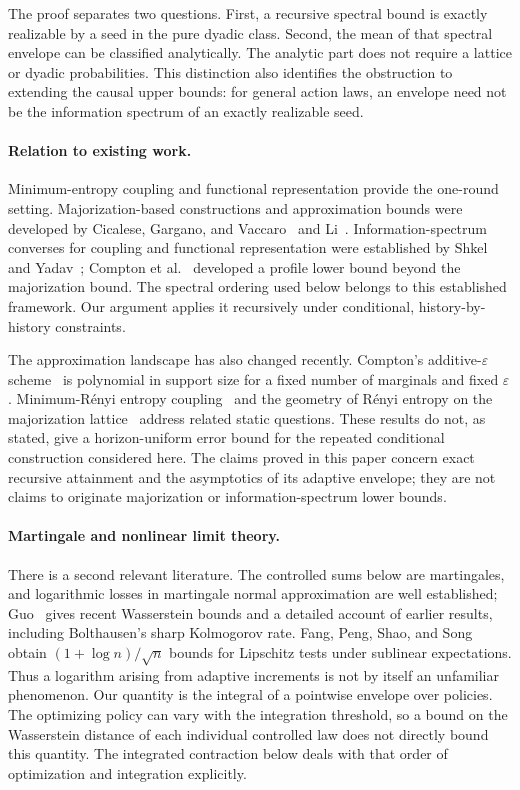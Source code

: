 \documentclass[11pt,a4paper]{article}
\numberwithin{equation}{section}
\begin{document}
The proof separates two questions. First, a recursive spectral bound is
exactly realizable by a seed in the pure dyadic class. Second, the mean
of that spectral envelope can be classified analytically. The analytic
part does not require a lattice or dyadic probabilities. This distinction
also identifies the obstruction to extending the causal upper bounds:
for general action laws, an envelope need not be the information spectrum
of an exactly realizable seed.

\paragraph{Relation to existing work.}
Minimum-entropy coupling and functional representation provide the
one-round setting. Majorization-based constructions and approximation
bounds were developed by Cicalese, Gargano, and Vaccaro~\cite{CGV19}
and Li~\cite{Li21}. Information-spectrum converses for coupling and
functional representation were established by Shkel and
Yadav~\cite{SY23}; Compton et al.~\cite{CKQGK23} developed a profile
lower bound beyond the majorization bound. The spectral ordering used
below belongs to this established framework. Our argument applies it
recursively under conditional, history-by-history constraints.

The approximation landscape has also changed recently. Compton's
additive-$\varepsilon$ scheme~\cite{Compton26} is polynomial in support
size for a fixed number of marginals and fixed $\varepsilon$.
Minimum-R\'enyi entropy coupling~\cite{Ma25} and the geometry of R\'enyi
entropy on the majorization lattice~\cite{YS26} address related static
questions. These results do not, as stated, give a horizon-uniform error
bound for the repeated conditional construction considered here. The
claims proved in this paper concern exact recursive attainment and the
asymptotics of its adaptive envelope; they are not claims to originate
majorization or information-spectrum lower bounds.

\paragraph{Martingale and nonlinear limit theory.}
There is a second relevant literature. The controlled sums below are
martingales, and logarithmic losses in martingale normal approximation
are well established; Guo~\cite{Guo24} gives recent Wasserstein bounds
and a detailed account of earlier results, including Bolthausen's sharp
Kolmogorov rate. Fang, Peng, Shao, and Song~\cite{FPSS19} obtain
$(1+\log n)/\sqrt n$ bounds for Lipschitz tests under sublinear
expectations. Thus a logarithm arising from adaptive increments is not
by itself an unfamiliar phenomenon. Our quantity is the integral of a
pointwise envelope over policies. The optimizing policy can vary with
the integration threshold, so a bound on the Wasserstein distance of
each individual controlled law does not directly bound this quantity.
The integrated contraction below deals with that order of optimization
and integration explicitly.
\end{document}
